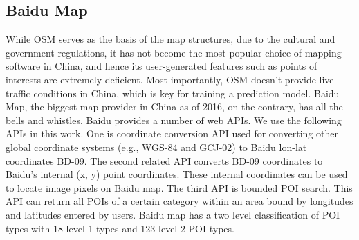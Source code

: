 
\subsection{Baidu Map}
While OSM serves as the basis of the map structures, due to the 
cultural and government regulations, it has not become the 
most popular choice of mapping software in China, 
and hence its user-generated features such 
as points of interests are extremely deficient. 
Most importantly, OSM doesn't provide live traffic 
conditions in China, which is key for training a prediction
model. Baidu Map, the biggest map provider in China as of 2016, 
on the contrary, has all the bells and whistles. 
Baidu provides a number of web APIs. We use the following APIs in this
work. One is coordinate conversion API used for converting other 
global coordinate systems (e.g., WGS-84 and GCJ-02) to Baidu lon-lat 
coordinates BD-09. The second related API converts BD-09 coordinates
to Baidu's internal (x, y) point coordinates. These internal coordinates
can be used to locate image pixels on Baidu map.
The third API is bounded POI search. 
This API can return all POIs of a certain category
within an area bound by longitudes and latitudes entered by users.
Baidu map has a two level classification of POI types with 18 level-1
types and 123 level-2 POI types.

